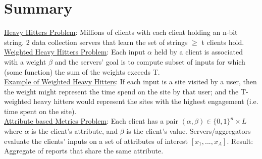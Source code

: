 
\clearpage
{}

%
\setcounter{section}{0} %

\section{Summary}
\underline{Heavy Hitters Problem}: Millions of clients with each client holding an n-bit string. 2 data collection servers that learn the set of strings $\ge$ t clients hold.\\

\underline{Weighted Heavy Hitters Problem}: Each input $\alpha$ held by a client is associated with a weight $\beta$ and the servers' goal is to compute subset of inputs for which (some function) the sum of the weights exceeds T.\\

\underline{Example of Weighted Heavy Hitters}: If each input is a site visited by a user, then the weight might represent the time spend on the site by that user; and the T-weighted heavy hitters would represent the sites with the highest engagement (i.e. time spent on the site).\\

\underline{Attribute based Metrics Problem}: Each client has a pair $(\alpha, \beta) \in \{0, 1\}^n \times L$ where $\alpha$ is the client's attribute, and $\beta$ is the client's value. Servers/aggregators evaluate the clients' inputs on a set of attributes of interest $[x_1, ..., x_A]$. Result: Aggregate of reports that share the same attribute.

